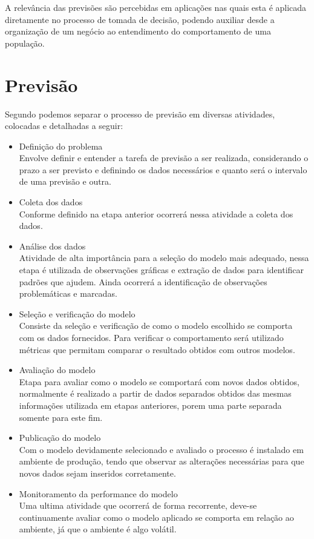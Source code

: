 \documentclass[
	12pt,
	oneside,
	a4paper,
	english,
	brazil
]{abntex2}
\begin{document}
A relevância das previsões são percebidas em aplicações nas quais esta é 
aplicada diretamente no processo de tomada de decisão, podendo auxiliar desde a 
organização de um negócio ao entendimento do comportamento de uma população.

\section{Previsão}
Segundo  podemos separar o processo de previsão em diversas 
atividades, colocadas e detalhadas a seguir:

\begin{itemize}
	\item Definição do problema\\
		Envolve definir e entender a tarefa de previsão a ser realizada,
		considerando o prazo a ser previsto e definindo os dados necessários e
		quanto será o intervalo de uma previsão e outra.
	\item Coleta dos dados\\
		Conforme definido na etapa anterior ocorrerá nessa atividade a coleta
		dos dados.
	\item Análise dos dados\\
		Atividade de alta importância para a seleção do modelo mais adequado,
		nessa etapa é utilizada de observações gráficas e extração de dados para
		identificar padrões que ajudem. Ainda ocorrerá a identificação de 
		observações problemáticas e marcadas.
	\item Seleção e verificação do modelo\\
		Consiste da seleção e verificação de como o modelo escolhido se comporta 
		com os dados fornecidos. Para verificar o comportamento será utilizado 
		métricas que permitam comparar o resultado obtidos com outros modelos.
	\item Avaliação do modelo\\
		Etapa para avaliar como o modelo se comportará com novos dados obtidos, 
		normalmente é realizado a partir de dados separados obtidos das mesmas 
		informações utilizada em etapas anteriores, porem uma parte separada 
		somente para este fim.
	\item Publicação do modelo\\
		Com o modelo devidamente selecionado e avaliado o processo é instalado 
		em ambiente de produção, tendo que observar as alterações necessárias 
		para que novos dados sejam inseridos corretamente.
	\item Monitoramento da performance do modelo\\
		Uma ultima atividade que ocorrerá de forma recorrente, deve-se 
		continuamente avaliar como o modelo aplicado se comporta em relação ao 
		ambiente, já que o ambiente é algo volátil.
\end{itemize}
\end{document}
